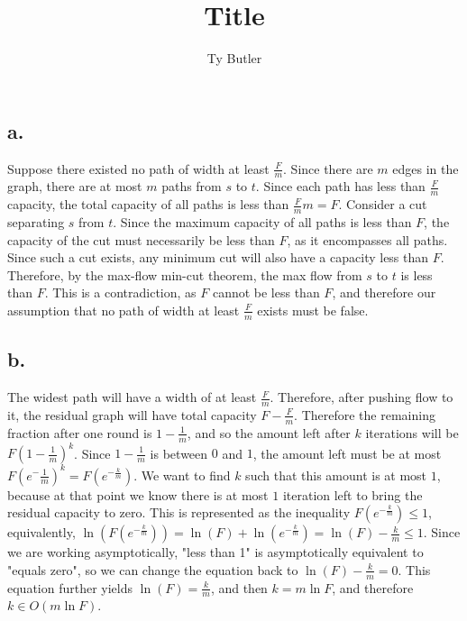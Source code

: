 \documentclass{article}
\title{Title}
\author{Ty Butler}
\begin{document}
\maketitle{}

\section{}
\subsection*{a.}
Suppose there existed no path of width at least $\frac{F}{m}$. Since there are $m$ edges in the graph, there are at most $m$ paths from $s$ to $t$. Since each path has less than $\frac{F}{m}$ capacity, the total capacity of all paths is less than $\frac{F}{m} m = F$. Consider a cut separating $s$ from $t$. Since the maximum capacity of all paths is less than $F$, the capacity of the cut must necessarily be less than $F$, as it encompasses all paths. Since such a cut exists, any minimum cut will also have a capacity less than $F$. Therefore, by the max-flow min-cut theorem, the max flow from $s$ to $t$ is less than $F$. This is a contradiction, as $F$ cannot be less than $F$, and therefore our assumption that no path of width at least $\frac{F}{m}$ exists must be false. 

\subsection*{b.}
The widest path will have a width of at least $\frac{F}{m}$. Therefore, after pushing flow to it, the residual graph will have total capacity $F - \frac{F}{m}$. Therefore the remaining fraction after one round is $1 - \frac{1}{m}$, and so the amount left after $k$ iterations will be $F(1 - \frac{1}{m})^k$. Since $1 - \frac{1}{m}$ is between $0$ and $1$, the amount left must be at most $F(e^-{\frac{1}{m}})^k = F(e^{-\frac{k}{m}})$. We want to find $k$ such that this amount is at most $1$, because at that point we know there is at most $1$ iteration left to bring the residual capacity to zero. This is represented as the inequality $F(e^{-\frac{k}{m}}) \leq 1$, equivalently, $\ln(F(e^{-\frac{k}{m}})) = \ln(F) + \ln(e^{-\frac{k}{m}}) = \ln(F) - \frac{k}{m} \leq 1$. Since we are working asymptotically, "less than 1" is asymptotically equivalent to "equals zero", so we can change the equation back to $\ln(F) - \frac{k}{m} = 0$. This equation further yields $\ln(F) = \frac{k}{m}$, and then $k = m\ln F$, and therefore $k \in O(m \ln F)$. 
\end{document}
